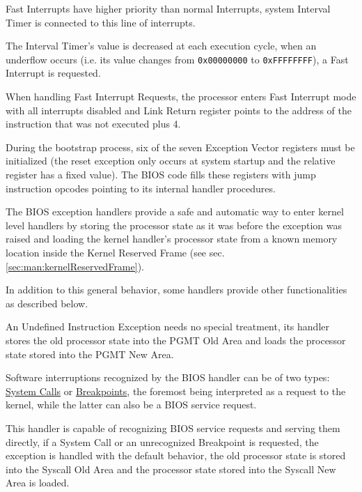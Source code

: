 Fast Interrupts have higher priority than normal Interrupts, system Interval Timer is connected to this line of interrupts. 

The Interval Timer's value is decreased at each execution cycle, when an underflow occurs (i.e. its value changes from \texttt{0x00000000} to \texttt{0xFFFFFFFF}), a Fast Interrupt is requested.

When handling Fast Interrupt Requests, the processor enters Fast Interrupt mode with all interrupts disabled and Link Return register points to the address of the instruction that was not executed plus 4.

\label{sec:man:romExceptionHandlers}

During the bootstrap process, six of the seven Exception Vector registers must be initialized (the reset exception only occurs at system startup and the relative register has a fixed value).
The BIOS code fills these registers with jump instruction opcodes pointing to its internal handler procedures.

The BIOS exception handlers provide a safe and automatic way to enter kernel level handlers by storing the processor state as it was before the exception was raised and loading the kernel handler's processor state from a known memory location inside the Kernel Reserved Frame (see sec. \ref{sec:man:kernelReservedFrame}).

In addition to this general behavior, some handlers provide other functionalities as described below.


An Undefined Instruction Exception needs no special treatment, its handler stores the old processor state into the PGMT Old Area and loads the processor state stored into the PGMT New Area.


Software interruptions recognized by the BIOS handler can be of two types: \uline{System Calls} or \uline{Breakpoints}, the foremost being interpreted as a request to the kernel, while the latter can also be a BIOS service request.

This handler is capable of recognizing BIOS service requests and serving them directly, if a System Call or an unrecognized Breakpoint is requested, the exception is handled with the default behavior, the old processor state is stored into the Syscall Old Area and the processor state stored into the Syscall New Area is loaded.

